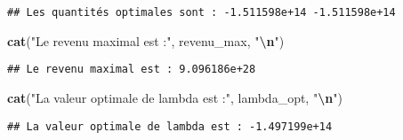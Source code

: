 \documentclass[
]{article}
\newenvironment{Shaded}{\begin{snugshade}}{\end{snugshade}}
\newcommand{\AttributeTok}[1]{\textcolor[rgb]{0.13,0.29,0.53}{#1}}
\newcommand{\CommentTok}[1]{\textcolor[rgb]{0.56,0.35,0.01}{\textit{#1}}}
\newcommand{\DecValTok}[1]{\textcolor[rgb]{0.00,0.00,0.81}{#1}}
\newcommand{\FunctionTok}[1]{\textcolor[rgb]{0.13,0.29,0.53}{\textbf{#1}}}
\newcommand{\NormalTok}[1]{#1}
\newcommand{\OtherTok}[1]{\textcolor[rgb]{0.56,0.35,0.01}{#1}}
\newcommand{\SpecialCharTok}[1]{\textcolor[rgb]{0.81,0.36,0.00}{\textbf{#1}}}
\newcommand{\StringTok}[1]{\textcolor[rgb]{0.31,0.60,0.02}{#1}}
\begin{document}
\begin{Shaded}
\end{Shaded}

\begin{verbatim}
## Les quantités optimales sont : -1.511598e+14 -1.511598e+14
\end{verbatim}

\begin{Shaded}
\begin{Highlighting}[]
\FunctionTok{cat}\NormalTok{(}\StringTok{"Le revenu maximal est :"}\NormalTok{, revenu\_max, }\StringTok{"}\SpecialCharTok{\textbackslash{}n}\StringTok{"}\NormalTok{)}
\end{Highlighting}
\end{Shaded}

\begin{verbatim}
## Le revenu maximal est : 9.096186e+28
\end{verbatim}

\begin{Shaded}
\begin{Highlighting}[]
\FunctionTok{cat}\NormalTok{(}\StringTok{"La valeur optimale de lambda est :"}\NormalTok{, lambda\_opt, }\StringTok{"}\SpecialCharTok{\textbackslash{}n}\StringTok{"}\NormalTok{)}
\end{Highlighting}
\end{Shaded}

\begin{verbatim}
## La valeur optimale de lambda est : -1.497199e+14
\end{verbatim}
\end{document}
